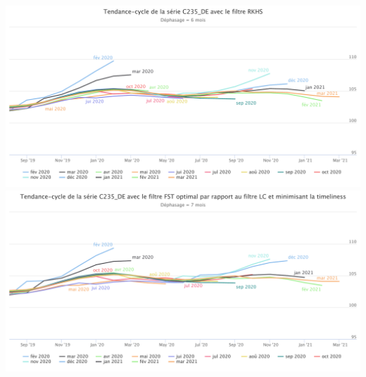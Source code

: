\documentclass[10pt,xcolor=table,color={dvipsnames,usenames},ignorenonframetext,usepdftitle=false,french]{beamer}
\newcommand\1{\mathds{1}}
\begin{document}
\begin{frame}{}
\protect\hypertarget{section-2}{}
\begin{center}\includegraphics[height=0.5\paperheight]{img/simulations/c235_de_rkhs_timeliness} \includegraphics[height=0.5\paperheight]{img/simulations/c235_de_fst_lc} \end{center}
\end{frame}
\end{document}
